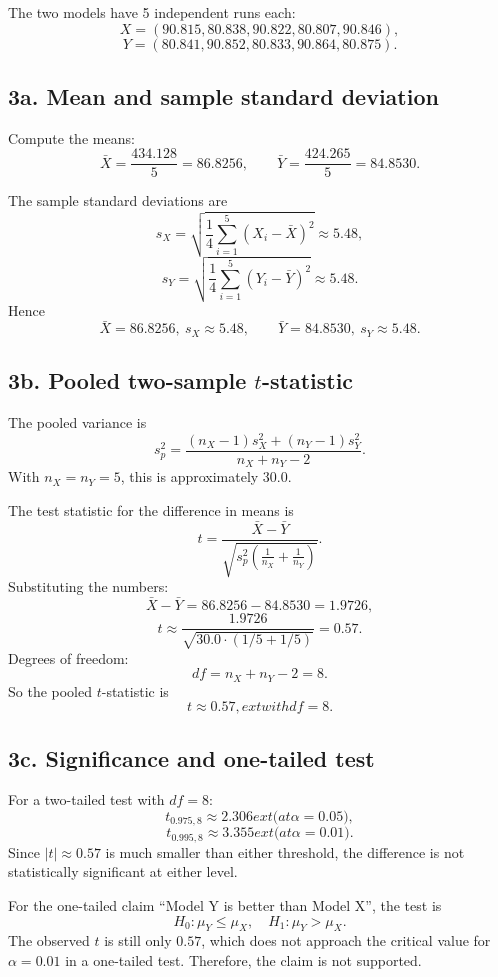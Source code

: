 \documentclass[11pt]{article}
\begin{document}
The two models have 5 independent runs each:
\[
X = (90.815,80.838,90.822,80.807,90.846),
\]
\[
Y = (80.841,90.852,80.833,90.864,80.875).
\]

\subsection*{3a. Mean and sample standard deviation}

Compute the means:
\[
\bar X = \frac{434.128}{5}=86.8256,
\qquad
\bar Y = \frac{424.265}{5}=84.8530.
\]

The sample standard deviations are
\[
 s_X = \sqrt{ \frac{1}{4}\sum_{i=1}^5 (X_i-\bar X)^2 } \approx 5.48,
\]
\[
 s_Y = \sqrt{ \frac{1}{4}\sum_{i=1}^5 (Y_i-\bar Y)^2 } \approx 5.48.
\]
Hence
\[
\boxed{\bar X = 86.8256,\ s_X\approx 5.48},\qquad
\boxed{\bar Y = 84.8530,\ s_Y\approx 5.48}.
\]

\subsection*{3b. Pooled two-sample $t$-statistic}

The pooled variance is
\[
 s_p^2 = \frac{(n_X-1)s_X^2+(n_Y-1)s_Y^2}{n_X+n_Y-2}.
\]
With $n_X=n_Y=5$, this is approximately $30.0$.

The test statistic for the difference in means is
\[
 t = \frac{\bar X-\bar Y}{\sqrt{s_p^2\left(\frac{1}{n_X}+\frac{1}{n_Y}\right)}}.
\]
Substituting the numbers:
\[
\bar X-\bar Y = 86.8256-84.8530 = 1.9726,
\]
\[
 t \approx \frac{1.9726}{\sqrt{30.0\cdot(1/5+1/5)}} = 0.57.
\]
Degrees of freedom:
\[
\boxed{df = n_X+n_Y-2 = 8.}
\]
So the pooled $t$-statistic is
\[
\boxed{t\approx 0.57,	ext{ with }df=8.}
\]

\subsection*{3c. Significance and one-tailed test}

For a two-tailed test with $df=8$:
\[
 t_{0.975,8} \approx 2.306	ext{ (at }\alpha=0.05),
\]
\[
 t_{0.995,8} \approx 3.355	ext{ (at }\alpha=0.01).
\]
Since $|t|\approx 0.57$ is much smaller than either threshold, the difference is not statistically significant at either level.

For the one-tailed claim “Model Y is better than Model X”, the test is
\[
H_0: \mu_Y \le \mu_X, \quad H_1: \mu_Y > \mu_X.
\]
The observed $t$ is still only $0.57$, which does not approach the critical value for $\alpha=0.01$ in a one-tailed test. Therefore, the claim is not supported.
\end{document}
